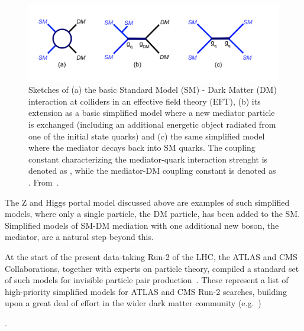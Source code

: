 \begin{figure}[!htpb]
\includegraphics[width=\textwidth]{figures/MonoX.pdf}
\caption{Sketches of (a) the basic Standard Model (SM) - Dark Matter (DM) interaction at colliders in an effective field theory (EFT), (b) its extension as a basic simplified model where a new mediator particle is exchanged (including an additional energetic object radiated from one of the initial state quarks) and (c) the same simplified model where the mediator decays back into SM quarks. The coupling constant characterizing the mediator-quark interaction strenght is denoted as \gq, while the mediator-DM coupling constant is denoted as \gdm. From~\cite{monoXfig}.}
\label{fig:monoX}
\end{figure}

The Z and Higgs portal model discussed above are examples of such simplified models, where only a single particle, the DM particle, has been added to the SM. 
Simplified models of SM-DM mediation with one additional new boson, the mediator, are a natural step beyond this. 

At the start of the present data-taking Run-2 of the LHC, the ATLAS and CMS Collaborations, together with experts on particle theory, compiled a standard set of such models for invisible particle pair production~\cite{Abercrombie:2015wmb}. These represent a list of high-priority simplified models for ATLAS and CMS Run-2 searches, building upon a great deal of effort in the wider dark matter community (e.g.~\cite{Fox:2011pm,Yavin:14092893,Malik:2014ggr,Abdallah:2015ter}) 
\begin{marginnote}[]
\end{marginnote}. 

